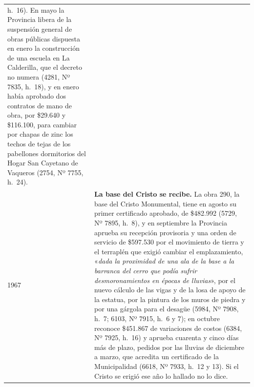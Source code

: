 \begin{longtable}{@{}p{2.7cm}p{10.3cm}@{}}
h.\ 16). En mayo la Provincia libera de la suspensión general de obras públicas dispuesta en enero la construcción de una escuela en La Calderilla, que el decreto no numera (4281, Nº 7835, h.\ 18), y en enero había aprobado dos contratos de mano de obra, por \$29.640 y \$116.100, para cambiar por chapas de zinc los techos de tejas de los pabellones dormitorios del Hogar San Cayetano de Vaqueros (2754, Nº 7755, h.\ 24). \\
1967 & \textbf{La base del Cristo se recibe.} La obra 290, la base del Cristo Monumental, tiene en agosto su primer certificado aprobado, de \$482.992 (5729, Nº 7895, h.\ 8), y en septiembre la Provincia aprueba su recepción provisoria y una orden de servicio de \$597.530 por el movimiento de tierra y el terraplén que exigió cambiar el emplazamiento, «\textit{dada la proximidad de una ala de la base a la barranca del cerro que podía sufrir desmoronamientos en épocas de lluvias}», por el nuevo cálculo de las vigas y de la losa de apoyo de la estatua, por la pintura de los muros de piedra y por una gárgola para el desagüe (5984, Nº 7908, h.\ 7; 6103, Nº 7915, h.\ 6 y 7); en octubre reconoce \$451.867 de variaciones de costos (6384, Nº 7925, h.\ 16) y aprueba cuarenta y cinco días más de plazo, pedidos por las lluvias de diciembre a marzo, que acredita un certificado de la Municipalidad (6618, Nº 7933, h.\ 12 y 13). Si el Cristo se erigió ese año lo hallado no lo dice. \\

\end{longtable}
